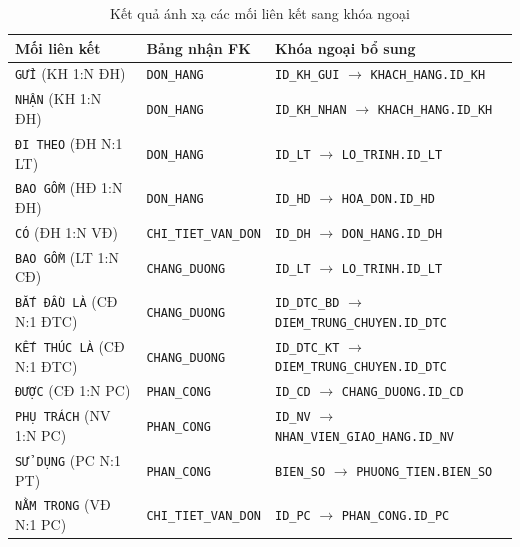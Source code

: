 \documentclass[11pt]{report}
\begin{document}
\begin{table}[H]
    \centering
    \renewcommand{\tabularxcolumn}[1]{m{#1}}
    \small
    \begin{tabularx}{\textwidth}{|l|l|X|} \hline
        \rowcolor{teal!30}
        \textbf{Mối liên kết} & \textbf{Bảng nhận FK} & \textbf{Khóa ngoại bổ sung} \\ \hline
        \texttt{GỬI} (KH 1:N ĐH)          & \texttt{DON\_HANG}           & \texttt{ID\_KH\_GUI} $\to$ \texttt{KHACH\_HANG.ID\_KH} \\ \hline
        \texttt{NHẬN} (KH 1:N ĐH)         & \texttt{DON\_HANG}           & \texttt{ID\_KH\_NHAN} $\to$ \texttt{KHACH\_HANG.ID\_KH} \\ \hline
        \texttt{ĐI THEO} (ĐH N:1 LT)      & \texttt{DON\_HANG}           & \texttt{ID\_LT} $\to$ \texttt{LO\_TRINH.ID\_LT} \\ \hline
        \texttt{BAO GỒM} (HĐ 1:N ĐH)      & \texttt{DON\_HANG}           & \texttt{ID\_HD} $\to$ \texttt{HOA\_DON.ID\_HD} \\ \hline
        \texttt{CÓ} (ĐH 1:N VĐ)           & \texttt{CHI\_TIET\_VAN\_DON} & \texttt{ID\_DH} $\to$ \texttt{DON\_HANG.ID\_DH} \\ \hline
        \texttt{BAO GỒM} (LT 1:N CĐ)      & \texttt{CHANG\_DUONG}        & \texttt{ID\_LT} $\to$ \texttt{LO\_TRINH.ID\_LT} \\ \hline
        \texttt{BẮT ĐẦU LÀ} (CĐ N:1 ĐTC)  & \texttt{CHANG\_DUONG}        & \texttt{ID\_DTC\_BD} $\to$ \texttt{DIEM\_TRUNG\_CHUYEN.ID\_DTC} \\ \hline
        \texttt{KẾT THÚC LÀ} (CĐ N:1 ĐTC) & \texttt{CHANG\_DUONG}        & \texttt{ID\_DTC\_KT} $\to$ \texttt{DIEM\_TRUNG\_CHUYEN.ID\_DTC} \\ \hline
        \texttt{ĐƯỢC} (CĐ 1:N PC)         & \texttt{PHAN\_CONG}          & \texttt{ID\_CD} $\to$ \texttt{CHANG\_DUONG.ID\_CD} \\ \hline
        \texttt{PHỤ TRÁCH} (NV 1:N PC)    & \texttt{PHAN\_CONG}          & \texttt{ID\_NV} $\to$ \texttt{NHAN\_VIEN\_GIAO\_HANG.ID\_NV} \\ \hline
        \texttt{SỬ DỤNG} (PC N:1 PT)      & \texttt{PHAN\_CONG}          & \texttt{BIEN\_SO} $\to$ \texttt{PHUONG\_TIEN.BIEN\_SO} \\ \hline
        \texttt{NẰM TRONG} (VĐ N:1 PC)    & \texttt{CHI\_TIET\_VAN\_DON} & \texttt{ID\_PC} $\to$ \texttt{PHAN\_CONG.ID\_PC} \\ \hline
    \end{tabularx}
    \caption{Kết quả ánh xạ các mối liên kết sang khóa ngoại}
    \label{tab:anhxa_lienket}
\end{table}
\end{document}
